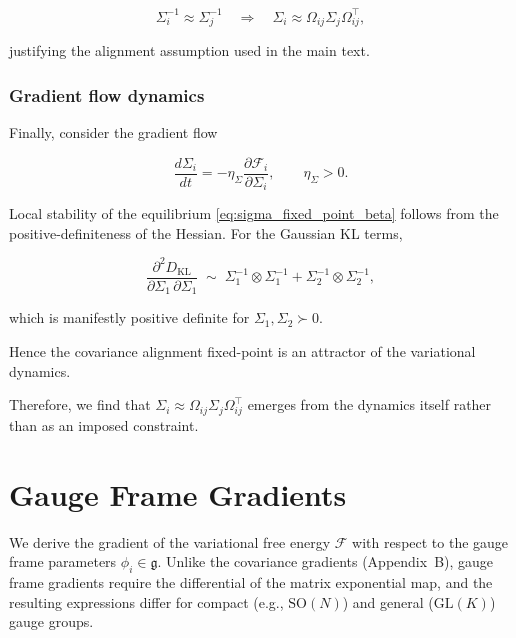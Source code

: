 \documentclass[twoside,11pt]{article}
\begin{document}
\begin{equation}
\Sigma_i^{-1} \approx \Sigma_j^{-1}
\quad\Longrightarrow\quad
\Sigma_i \approx \Omega_{ij}\Sigma_j\Omega_{ij}^\top,
\end{equation}

justifying the alignment assumption used in the main text.

\subsubsection{Gradient flow dynamics}

Finally, consider the gradient flow

\begin{equation}
\frac{d\Sigma_i}{dt}
=-\eta_\Sigma
\frac{\partial \mathcal{F}_i}{\partial \Sigma_i},
\qquad\eta_\Sigma > 0.
\end{equation}

Local stability of the equilibrium \eqref{eq:sigma_fixed_point_beta} follows from the positive-definiteness of the Hessian. For the Gaussian KL terms,

\begin{equation}
\frac{\partial^2 D_{\mathrm{KL}}}{\partial \Sigma_1 \, \partial \Sigma_1}
\;\sim\;
\Sigma_1^{-1} \otimes \Sigma_1^{-1}
+ \Sigma_2^{-1} \otimes \Sigma_2^{-1},
\end{equation}

which is manifestly positive definite for $\Sigma_1,\Sigma_2 \succ 0$.

Hence the covariance alignment fixed-point is an attractor of the variational dynamics.

Therefore, we find that $\Sigma_i \approx \Omega_{ij}\Sigma_j\Omega_{ij}^\top$ emerges from the dynamics itself rather than as an imposed constraint.
















\section{Gauge Frame Gradients}
\label{app:phi_gradients}

We derive the gradient of the variational free energy $\mathcal{F}$ with respect to the gauge frame parameters $\phi_i \in \mathfrak{g}$. Unlike the covariance gradients (Appendix~B), gauge frame gradients require the differential of the matrix exponential map, and the resulting expressions differ for compact (e.g., $\mathrm{SO}(N)$) and general ($\mathrm{GL}(K)$) gauge groups.
\end{document}

